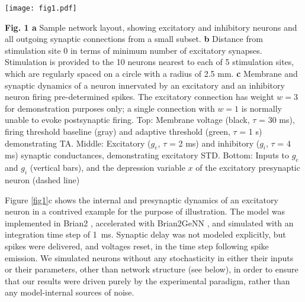 \documentclass[pdflatex,referee,iicol,sn-basic]{sn-jnl}
\theoremstyle{thmstyleone}%
\theoremstyle{thmstyletwo}%
\theoremstyle{thmstylethree}%
\begin{document}
\begin{figure*}%
    \centering
    \texttt{[image: fig1.pdf]}
    \caption{\textbf{a} Sample network layout, showing excitatory and inhibitory neurons and all outgoing synaptic connections from a small subset. \textbf{b} Distance from stimulation site 0 in terms of minimum number of excitatory synapses. Stimulation is provided to the 10 neurons nearest to each of 5 stimulation sites, which are regularly spaced on a circle with a radius of 2.5 mm. \textbf{c} Membrane and synaptic dynamics of a neuron innervated by an excitatory and an inhibitory neuron firing pre-determined spikes. The excitatory connection has weight $w = 3$ for demonstration purposes only; a single connection with $w = 1$ is normally unable to evoke postsynaptic firing. Top: Membrane voltage (black, $\tau$ = 30 ms), firing threshold baseline (gray) and adaptive threshold (green, $\tau$ = 1 s) demonstrating TA. Middle: Excitatory ($g_e$, $\tau$ = 2 ms) and inhibitory ($g_i$, $\tau$ = 4 ms) synaptic conductances, demonstrating excitatory STD. Bottom: Inputs to $g_e$ and $g_i$ (vertical bars), and the depression variable $x$ of the excitatory presynaptic neuron (dashed line)}
    \label{fig1}
\end{figure*}

\textbf{Fig. 1 a} Sample network layout, showing excitatory and inhibitory neurons and all outgoing synaptic connections from a small subset. \textbf{b} Distance from stimulation site 0 in terms of minimum number of excitatory synapses. Stimulation is provided to the 10 neurons nearest to each of 5 stimulation sites, which are regularly spaced on a circle with a radius of 2.5 mm. \textbf{c} Membrane and synaptic dynamics of a neuron innervated by an excitatory and an inhibitory neuron firing pre-determined spikes. The excitatory connection has weight $w = 3$ for demonstration purposes only; a single connection with $w = 1$ is normally unable to evoke postsynaptic firing. Top: Membrane voltage (black, $\tau$ = 30 ms), firing threshold baseline (gray) and adaptive threshold (green, $\tau$ = 1 s) demonstrating TA. Middle: Excitatory ($g_e$, $\tau$ = 2 ms) and inhibitory ($g_i$, $\tau$ = 4 ms) synaptic conductances, demonstrating excitatory STD. Bottom: Inputs to $g_e$ and $g_i$ (vertical bars), and the depression variable $x$ of the excitatory presynaptic neuron (dashed line)

Figure \ref{fig1}c shows the internal and presynaptic dynamics of an excitatory neuron in a contrived example for the purpose of illustration. The model was implemented in Brian2 \citep{Stimberg2019-tc}, accelerated with Brian2GeNN \citep{Stimberg2020-go}, and simulated with an integration time step of 1~ms. Synaptic delay was not modeled explicitly, but spikes were delivered, and voltages reset, in the time step following spike emission. We simulated neurons without any stochasticity in either their inputs or their parameters, other than network structure (see below), in order to ensure that our results were driven purely by the experimental paradigm, rather than any model-internal sources of noise.
\end{document}
